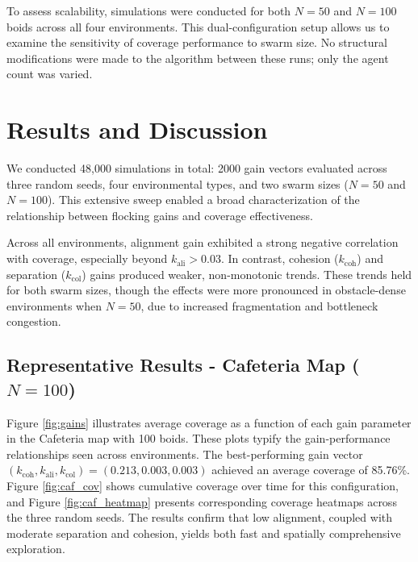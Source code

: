 \documentclass[12pt]{article}
\begin{document}
To assess scalability, simulations were conducted for both \(N = 50\) and \(N = 100\) boids across all four environments. This dual-configuration setup allows us to examine the sensitivity of coverage performance to swarm size. No structural modifications were made to the algorithm between these runs; only the agent count was varied.

\section{Results and Discussion}

We conducted 48,000 simulations in total: 2000 gain vectors evaluated across three random seeds, four environmental types, and two swarm sizes (\(N = 50\) and \(N = 100\)). This extensive sweep enabled a broad characterization of the relationship between flocking gains and coverage effectiveness.

Across all environments, alignment gain exhibited a strong negative correlation with coverage, especially beyond \(k_\text{ali} > 0.03\). In contrast, cohesion (\(k_\text{coh}\)) and separation (\(k_\text{col}\)) gains produced weaker, non-monotonic trends. These trends held for both swarm sizes, though the effects were more pronounced in obstacle-dense environments when \(N = 50\), due to increased fragmentation and bottleneck congestion.

\subsection{Representative Results - Cafeteria Map (\(N = 100\))}

Figure \ref{fig:gains} illustrates average coverage as a function of each gain parameter in the Cafeteria map with 100 boids. These plots typify the gain-performance relationships seen across environments. The best-performing gain vector \((k_\text{coh}, k_\text{ali}, k_\text{col}) = (0.213,0.003,0.003)\) achieved an average coverage of 85.76\%. Figure \ref{fig:caf_cov} shows cumulative coverage over time for this configuration, and Figure \ref{fig:caf_heatmap} presents corresponding coverage heatmaps across the three random seeds. The results confirm that low alignment, coupled with moderate separation and cohesion, yields both fast and spatially comprehensive exploration.
\end{document}
